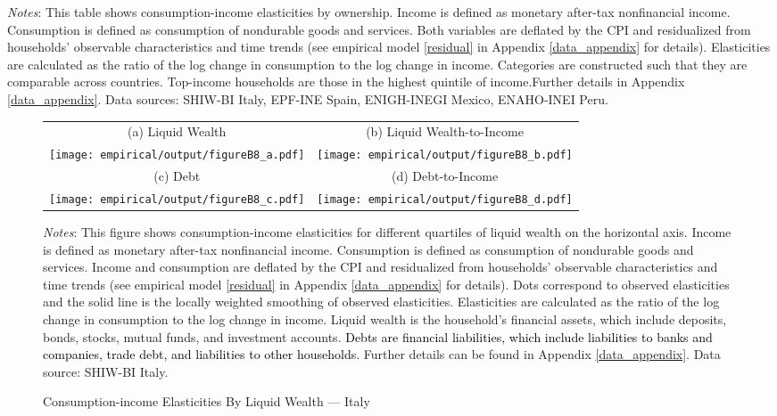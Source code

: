 \documentclass[12pt]{article}
\begin{document}
\begin{spacing}{1.5}
\begin{table}[H]
\begin{centering}
\par\end{centering}
\medskip{}
\raggedright{}\textit{\footnotesize{}Notes}{\footnotesize{}: This table shows consumption-income elasticities by ownership. Income is defined as monetary after-tax nonfinancial income. Consumption is defined as consumption of nondurable goods and services. Both variables are deflated by the CPI and residualized from households' observable characteristics and time trends (see empirical model \eqref{residual} in Appendix \ref{data_appendix} for details). Elasticities are calculated as the ratio of the log change in consumption to the log change in income. Categories are constructed such that they are comparable across countries. Top-income households are those in the highest quintile of income.Further details in Appendix \ref{data_appendix}. Data sources: SHIW-BI Italy, EPF-INE Spain, ENIGH-INEGI Mexico, ENAHO-INEI Peru.}{\footnotesize\par}
\end{table}


\newpage

\begin{figure}[H]
	\begin{tabular}{cc}
		{\small{}{(a) Liquid Wealth} } & {\small{}{(b) Liquid Wealth-to-Income} } \tabularnewline
		\texttt{[image: empirical/output/figureB8\_a.pdf]} &
		\texttt{[image: empirical/output/figureB8\_b.pdf]}   \\
		{\small{}{(c) Debt} } & {\small{}{(d) Debt-to-Income} } \tabularnewline
		\texttt{[image: empirical/output/figureB8\_c.pdf]} &
\texttt{[image: empirical/output/figureB8\_d.pdf]}
	\end{tabular}\caption{\color{black}Consumption-income Elasticities By Liquid Wealth --- Italy
		\label{fig_elasticities_incomedecile_residualized_panel}}
	\medskip{}
	\raggedright{}\textit{\footnotesize{}Notes}{\footnotesize{}: This figure shows consumption-income elasticities for different quartiles of liquid wealth on the horizontal axis. Income is defined as monetary after-tax nonfinancial income. Consumption is defined as consumption of nondurable goods and services. Income and consumption are deflated by the CPI and residualized from households' observable characteristics and time trends (see empirical model \eqref{residual} in Appendix \ref{data_appendix} for details). Dots correspond to observed elasticities and the solid line is the locally weighted smoothing of observed elasticities. Elasticities are calculated as the ratio of the log change in consumption to the log change in income. Liquid wealth is the household’s financial assets, which include deposits, bonds, stocks, mutual funds, and investment accounts.  \textcolor{black}{Debts are financial liabilities, which include liabilities to banks and companies, trade debt, and liabilities to other households. } Further details can be found in Appendix \ref{data_appendix}. Data source: SHIW-BI Italy.}{\footnotesize\par}
\end{figure}




\end{spacing}
\end{document}
